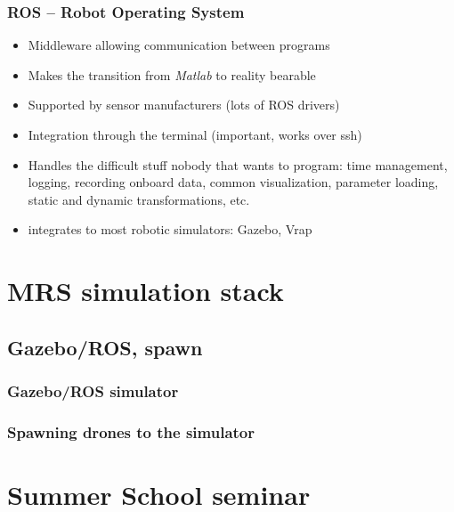 \documentclass{beamer}
\begin{document}
\begin{frame}
  \frametitle{ROS -- Robot Operating System}

  \begin{itemize}
    \item Middleware allowing communication between programs
    \item Makes the transition from \emph{Matlab} to reality bearable
    \item Supported by sensor manufacturers (lots of ROS drivers)
    \item Integration through the terminal (important, works over ssh)
    \item Handles the difficult stuff nobody that wants to program: time management, logging, recording onboard data, common visualization, parameter loading, static and dynamic transformations, etc.
    \item integrates to most robotic simulators: Gazebo, Vrap
  \end{itemize}

\end{frame}


\section{MRS simulation stack}

\subsection{Gazebo/ROS, spawn}

\begin{frame}
  \frametitle{Gazebo/ROS simulator}



\end{frame}

\begin{frame}
  \frametitle{Spawning drones to the simulator}



\end{frame}


\section{Summer School seminar}
\end{document}
